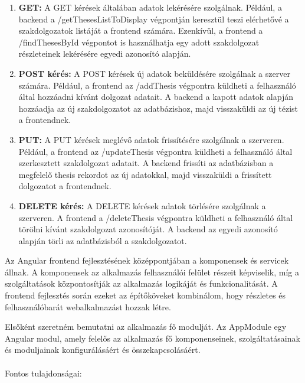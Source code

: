\begin{enumerate}

\item{\textbf{GET:}}
A GET kérések általában adatok lekérésére szolgálnak. Például, a backend a /getThesesListToDisplay végpontján keresztül teszi elérhetővé a szakdolgozatok listáját a frontend számára. Ezenkívül, a frontend a /findThesesById végpontot is használhatja egy adott szakdolgozat részleteinek lekérésére egyedi azonosító alapján.

\item{\textbf{POST kérés:}}
A POST kérések új adatok beküldésére szolgálnak a szerver számára. Például, a frontend az /addThesis végpontra küldheti a felhasználó által hozzáadni kívánt dolgozat adatait. A backend a kapott adatok alapján hozzáadja az új szakdolgozatot az adatbázishoz, majd visszaküldi az új tézist a frontendnek.

\item{\textbf{PUT:}}
A PUT kérések meglévő adatok frissítésére szolgálnak a szerveren. Például, a frontend az /updateThesis végpontra küldheti a felhasználó által szerkesztett szakdolgozat adatait. A backend frissíti az adatbázisban a megfelelő thesis rekordot az új adatokkal, majd visszaküldi a frissített dolgozatot a frontendnek.

\item{\textbf{DELETE kérés:}}
A DELETE kérések adatok törlésére szolgálnak a szerveren. A frontend a /deleteThesis végpontra küldheti a felhasználó által törölni kívánt szakdolgozat azonosítóját. A backend az egyedi azonosító alapján törli az adatbázisból a szakdolgozatot.

\end{enumerate}



Az Angular\cite{angular} frontend fejlesztésének középpontjában a komponensek és servicek állnak. A komponensek az alkalmazás felhasználói felület részeit képviselik, míg a szolgáltatások központosítják az alkalmazás logikáját és funkcionalitását. A frontend fejlesztés során ezeket az építőköveket kombinálom, hogy részletes és felhasználóbarát webalkalmazást hozzak létre.

Elsőként szeretném bemutatni az alkalmazás fő modulját. Az AppModule egy Angular\cite{angular} modul, amely felelős az alkalmazás fő komponenseinek, szolgáltatásainak és moduljainak konfigurálásáért és összekapcsolásáért. \\
\\Fontos tulajdonságai:

